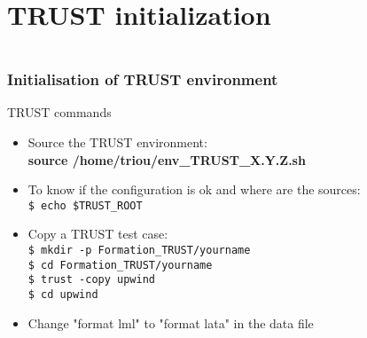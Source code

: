 \documentclass[10pt, hyperref={unicode=true,pdfusetitle, bookmarks=true,bookmarksnumbered=false,bookmarksopen=false, breaklinks=false,pdfborder={0 0 1},backref=true,colorlinks=true,linkcolor=darkblue,pageanchor, urlcolor=darkblue}]{beamer}
\begin{document}
\section{{\bf{TRUST initialization}}}
\begin{frame}
\begin{columns}[c] 
\tableofcontents[sections={1-4},currentsection, currentsubsection]
\tableofcontents[sections={5-8},currentsection, currentsubsection]
\end{columns}
\end{frame}
\begin{frame}
\frametitle{Initialisation of TRUST environment}
\begin{block}{TRUST commands}

\begin{itemize}
\item Source the TRUST environment:\\
\vspace{0.2cm}
\textbf{source  /home/triou/env\_TRUST\_X.Y.Z.sh}
\vspace{0.2cm}

\item To know if the configuration is ok and where are the sources:\\
\texttt{\$ echo \$TRUST\_ROOT}
\vspace{0.2cm}

\item Copy a TRUST test case:\\
\texttt{\$ mkdir -p Formation\_TRUST/yourname}\\
\texttt{\$ cd Formation\_TRUST/yourname}\\
\texttt{\$ trust -copy upwind}\\
\texttt{\$ cd upwind}\\
\item Change "format lml" to "format lata" in the data file\\
\end{itemize}

\end{block}
\end{frame}
\end{document}
